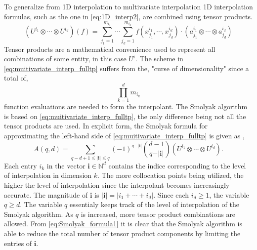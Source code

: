 To generalize from 1D interpolation to multivariate interpolation 1D interpolation formulas, such as the one in \ref{eq:1D_interp2}, are combined using tensor products.
\begin{equation} \label{eq:muitivariate_interp_fulltp}
    \left(U^{i_1} \otimes\cdots\otimes U^{i_d}\right)\left(f\right) = 
     \sum_{j_1=1}^{m_{i_1}} \cdots
      \sum_{j_d=1}^{m_{i_d}} f\left(
       x_{j_1}^{i_1},\cdots,x_{j_d}^{i_d}\right)\cdot
        \left(a_{j_1}^{i_1}\otimes\cdots\otimes a_{j_d}^{i_d}\right)
\end{equation}   
Tensor products are a mathematical convenience used to represent all combinations of some entity, in this case $U^i$. The scheme in \ref{eq:muitivariate_interp_fulltp} suffers from the, "curse of dimensionality" since a total of,
\begin{equation}
    \prod_{k=1}^d m_{i_k}
\end{equation}     
function evaluations are needed to form the interpolant. The Smolyak algorithm is based on \ref{eq:muitivariate_interp_fulltp}, the only difference being not all the tensor products are used. In explicit form, the Smolyak formula for approximating the left-hand side of \ref{eq:muitivariate_interp_fulltp} is given as \cite{NovakRitter},
\begin{equation} \label{eq:Smolyak_formula1}
    A\left(q,d\right) = 
     \sum_{q-d+1\leq \vert \textbf{i}\vert\leq q}
      \left(-1\right)^{q-\vert\textbf{i}\vert}
       \binom{d-1}{q-\vert\textbf{i}\vert}
        \left(U^{i_1} \otimes\cdots\otimes U^{i_d}\right).
\end{equation}
Each entry $i_k$ in the vector $\textbf{i} \in \mathbb{N}^d$ contains the indice corresponding to the level of interpolation in dimension $k$. The more collocation points being utilized, the higher the level of interpolation since the interpolant becomes increasingly accurate. The magnitude of $\textbf{i}$ is $\vert\textbf{i}\vert = \vert i_1 +\cdots+ i_d\vert$. Since each $i_d \geq 1$, the variable $q \geq d$. The variable $q$ essentialy keeps track of the level of interpolation of the Smolyak algorithm. As $q$ is increased, more tensor product combinations are allowed. From \ref{eq:Smolyak_formula1} it is clear that the Smolyak algorithm is able to reduce the total number of tensor product components by limiting the entries of $\textbf{i}$.

